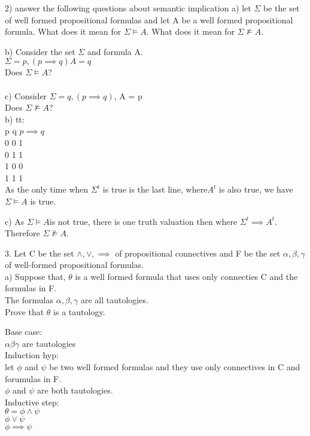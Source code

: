 \documentclass[12pt,oneside,fleqn]{article}
\theoremstyle{definition}
\begin{document}
2) answer the following questions about semantic implication
a) let $\Sigma$ be the set of well formed propositional formulas and let A be a well formed propositional formula. What does it mean for $\Sigma \vDash A$. What does it mean for $\Sigma \not \vDash A$.

b) Consider the set $\Sigma$ and formula A. \\
$\Sigma = { p, (p \implies q)} A = q$ \\
Does $\Sigma \models A$? \\ \\
c) Consider $\Sigma = { q, (p \implies q)} $, A = p \\
Does $\Sigma \not \models A$? \\

b) tt: \\
p q $p \implies q$ \\
0 0 1 \\
0 1 1 \\ 
1 0 0 \\ 
1 1 1 \\
As the only time when $\Sigma^t$ is true is the last line, where$ A^t$ is also true, we have $\Sigma \models A$ is true.

c)
As $\Sigma \models A $is not true, there is one truth valuation then where $\Sigma^t \implies A^t$. Therefore $\Sigma \not \models A$.

3.
Let C be the set ${ \land, \lor, \implies }$ of propositional connectives and F be the set ${ \alpha, \beta, \gamma }$ of well-formed propositional formulas. \\
a) Suppose that, $\theta$ is a well formed formula that uses only connecties C and the formulas in F. \\
The formulas $\alpha, \beta, \gamma$ are all tautologies. \\
Prove that $\theta$ is a tautology.

Base case: \\
$\alpha \beta \gamma$ are tautologies \\
Induction hyp: \\
let $\phi$ and $\psi$ be two well formed formulas and they use only connectives in C and forumulas in F. \\
$\phi$ and $\psi$ are both tautologies. \\
Inductive step: \\
$\theta = \phi \land \psi$ \\
$\phi \lor \psi$ \\
$\phi \implies \psi$ \\
\end{document}
